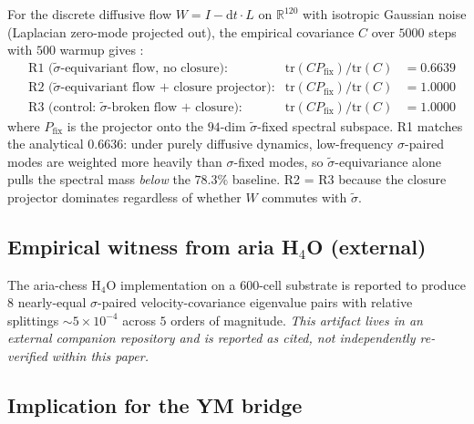\documentclass[11pt, a4paper]{amsart}
\theoremstyle{definition}
\newcommand{\R}{\mathbb{R}}
\begin{document}
For the discrete diffusive flow $W = I - \mathrm{d}t \cdot L$ on
$\R^{120}$ with isotropic Gaussian noise (Laplacian zero-mode
projected out), the empirical covariance $C$ over $5000$ steps
with $500$ warmup gives \cite{CascadeAttractorDynamics}:
\begin{align*}
&\text{R1 ($\widetilde\sigma$-equivariant flow, no closure):}
  &\mathrm{tr}(C P_{\mathrm{fix}})/\mathrm{tr}(C) &= 0.6639 \\
&\text{R2 ($\widetilde\sigma$-equivariant flow + closure projector):}
  &\mathrm{tr}(C P_{\mathrm{fix}})/\mathrm{tr}(C) &= 1.0000 \\
&\text{R3 (control: $\widetilde\sigma$-broken flow + closure):}
  &\mathrm{tr}(C P_{\mathrm{fix}})/\mathrm{tr}(C) &= 1.0000
\end{align*}
where $P_{\mathrm{fix}}$ is the projector onto the $94$-dim
$\widetilde\sigma$-fixed spectral subspace.  R1 matches the
analytical $0.6636$: under purely diffusive dynamics, low-frequency
$\sigma$-paired modes are weighted more heavily than $\sigma$-fixed
modes, so $\widetilde\sigma$-equivariance alone pulls the spectral
mass \emph{below} the $78.3\%$ baseline.  R2 = R3 because the
closure projector dominates regardless of whether $W$ commutes
with $\widetilde\sigma$.

\subsection{Empirical witness from aria H$_4$O (external)}

The aria-chess H$_4$O implementation \cite{ariaH4Olaw} on a
600-cell substrate is reported to produce $8$ nearly-equal
$\sigma$-paired velocity-covariance eigenvalue pairs with relative
splittings $\sim 5\times 10^{-4}$ across $5$ orders of magnitude.
\emph{This artifact lives in an external companion repository and
is reported as cited, not independently re-verified within this
paper.}

\subsection{Implication for the YM bridge}
\end{document}
